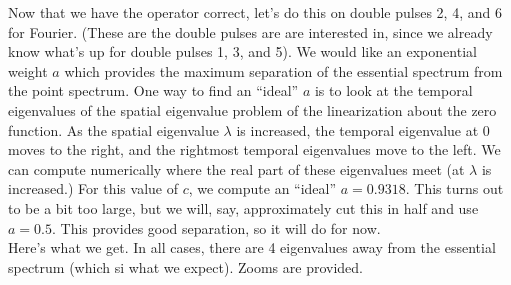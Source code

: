 \documentclass[12pt]{article}
\begin{document}
Now that we have the operator correct, let's do this on double pulses 2, 4, and 6 for Fourier. (These are the double pulses are are interested in, since we already know what's up for double pulses 1, 3, and 5). We would like an exponential weight $a$ which provides the maximum separation of the essential spectrum from the point spectrum. One way to find an ``ideal'' $a$ is to look at the temporal eigenvalues of the spatial eigenvalue problem of the linearization about the zero function. As the spatial eigenvalue $\lambda$ is increased, the temporal eigenvalue at 0 moves to the right, and the rightmost temporal eigenvalues move to the left. We can compute numerically where the real part of these eigenvalues meet (at $\lambda$ is increased.) For this value of $c$, we compute an ``ideal'' $a = 0.9318$. This turns out to be a bit too large, but we will, say, approximately cut this in half and use $a = 0.5$. This provides good separation, so it will do for now.\\

Here's what we get. In all cases, there are 4 eigenvalues away from the essential spectrum (which si what we expect). Zooms are provided.
\end{document}
